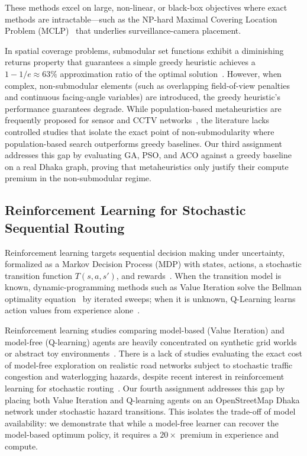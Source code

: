 \documentclass{ai-lab-report}
\begin{document}
These methods excel on large, non-linear, or black-box objectives where exact methods are intractable—such as the NP-hard Maximal Covering Location Problem (MCLP)~\citep{church1974maximal} that underlies surveillance-camera placement.

In spatial coverage problems, submodular set functions exhibit a diminishing returns property that guarantees a simple greedy heuristic achieves a $1-1/e \approx 63\%$ approximation ratio of the optimal solution~\citep{nemhauser1978submodular}. However, when complex, non-submodular elements (such as overlapping field-of-view penalties and continuous facing-angle variables) are introduced, the greedy heuristic's performance guarantees degrade. While population-based metaheuristics are frequently proposed for sensor and CCTV networks~\citep{fausto2025metaheuristics,abdesselam2018three}, the literature lacks controlled studies that isolate the exact point of non-submodularity where population-based search outperforms greedy baselines. Our third assignment addresses this gap by evaluating GA, PSO, and ACO against a greedy baseline on a real Dhaka graph, proving that metaheuristics only justify their compute premium in the non-submodular regime.

\subsection{Reinforcement Learning for Stochastic Sequential Routing}
Reinforcement learning targets sequential decision making under uncertainty, formalized as a Markov Decision Process (MDP) with states, actions, a stochastic transition function $T(s,a,s')$, and rewards~\citep{sutton2018rl,puterman1994markov}. When the transition model is known, dynamic-programming methods such as Value Iteration solve the Bellman optimality equation~\citep{bellman1957dynamic,howard1960dynamic} by iterated sweeps; when it is unknown, Q-Learning learns action values from experience alone~\citep{watkins1992qlearning}.

Reinforcement learning studies comparing model-based (Value Iteration) and model-free (Q-learning) agents are heavily concentrated on synthetic grid worlds or abstract toy environments~\citep{sutton2018rl}. There is a lack of studies evaluating the exact cost of model-free exploration on realistic road networks subject to stochastic traffic congestion and waterlogging hazards, despite recent interest in reinforcement learning for stochastic routing~\citep{iklassov2024reinforcement}. Our fourth assignment addresses this gap by placing both Value Iteration and Q-learning agents on an OpenStreetMap Dhaka network under stochastic hazard transitions. This isolates the trade-off of model availability: we demonstrate that while a model-free learner can recover the model-based optimum policy, it requires a $20\times$ premium in experience and compute.
\end{document}
